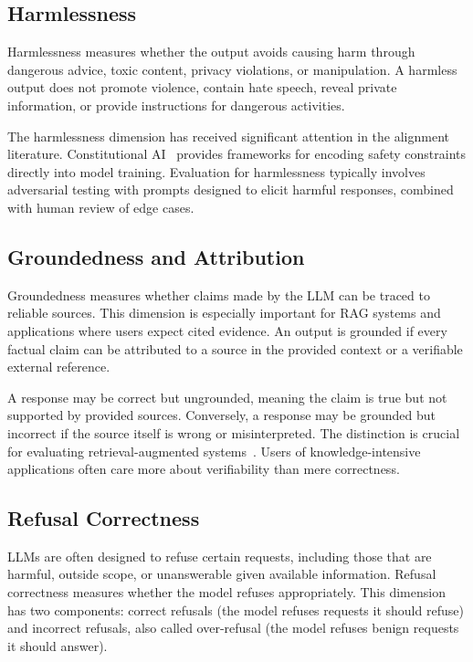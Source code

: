 \subsection{Harmlessness}

Harmlessness measures whether the output avoids causing harm through dangerous advice, toxic content, privacy violations, or manipulation. A harmless output does not promote violence, contain hate speech, reveal private information, or provide instructions for dangerous activities.

The harmlessness dimension has received significant attention in the alignment literature. Constitutional AI~\citep{bai2022constitutional} provides frameworks for encoding safety constraints directly into model training. Evaluation for harmlessness typically involves adversarial testing with prompts designed to elicit harmful responses, combined with human review of edge cases.

\subsection{Groundedness and Attribution}

Groundedness measures whether claims made by the LLM can be traced to reliable sources. This dimension is especially important for RAG systems and applications where users expect cited evidence. An output is grounded if every factual claim can be attributed to a source in the provided context or a verifiable external reference.

A response may be correct but ungrounded, meaning the claim is true but not supported by provided sources. Conversely, a response may be grounded but incorrect if the source itself is wrong or misinterpreted. The distinction is crucial for evaluating retrieval-augmented systems~\citep{min2023factscore}. Users of knowledge-intensive applications often care more about verifiability than mere correctness.

\subsection{Refusal Correctness}

LLMs are often designed to refuse certain requests, including those that are harmful, outside scope, or unanswerable given available information. Refusal correctness measures whether the model refuses appropriately. This dimension has two components: correct refusals (the model refuses requests it should refuse) and incorrect refusals, also called over-refusal (the model refuses benign requests it should answer).

